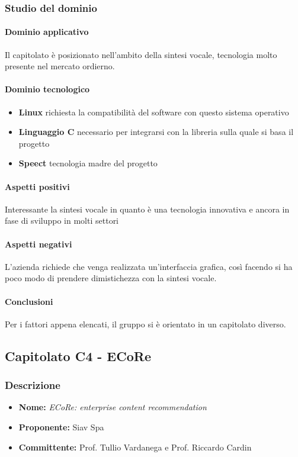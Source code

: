	\subsubsection{Studio del dominio}
	
	\paragraph{Dominio applicativo} \Spazio
     Il capitolato è posizionato nell'ambito della sintesi vocale, tecnologia molto presente nel mercato ordierno. 
	\paragraph{Dominio tecnologico}
	\begin{itemize}
		\item \textbf{Linux} richiesta la compatibilità del software con questo sistema operativo
		\item  \textbf{Linguaggio C} necessario per integrarsi con la libreria sulla quale si basa il progetto
		\item  \textbf{Speect} tecnologia madre del progetto
	\end{itemize}
	\paragraph{Aspetti positivi} \Spazio
	Interessante la sintesi vocale in quanto è una tecnologia innovativa e ancora in fase di sviluppo in molti settori  
	\paragraph{Aspetti negativi} \Spazio
	L'azienda richiede che venga realizzata un'interfaccia grafica, così facendo si ha poco modo di prendere dimistichezza con la sintesi vocale. 
	\paragraph{Conclusioni} \Spazio
	Per i fattori appena elencati, il gruppo si è orientato in un capitolato diverso.
	
	\subsection{Capitolato C4 - ECoRe}
	\subsubsection{Descrizione}
	\begin{itemize}
		\item \textbf{Nome:} \emph{ECoRe: enterprise content recommendation}
		\item \textbf{Proponente:} Siav Spa
		\item \textbf{Committente:} Prof. Tullio Vardanega e Prof. Riccardo Cardin
	\end{itemize}
    
